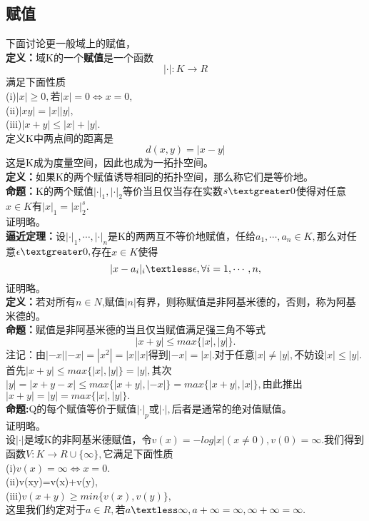 \documentclass[UTF8]{article}
\begin{document}
    \subsection{赋值}
  下面讨论更一般域上的赋值，\\
  \textbf{定义：}域K的一个\textbf{赋值}是一个函数$$
  |\cdot |:K\rightarrow R
  $$
 满足下面性质\\
 (i)$|x|\geq 0,$若$|x|=0\iff x=0,$\\
 (ii)$|xy|=|x||y|,$\\
 (iii)$|x+y|\leq |x|+|y|.$\\
     定义K中两点间的距离是$$
     d(x,y)=|x-y|
     $$
     这是K成为度量空间，因此也成为一拓扑空间。\\
     \textbf{定义：}如果K的两个赋值诱导相同的拓扑空间，那么称它们是等价地。\\
     \textbf{命题：}K的两个赋值$|\cdot|_{1},|\cdot|_{2}$等价当且仅当存在实数$s\textgreater0$使得对任意$x\in K$有$|x|_{1}=|x|_{2}^{s}.$\\
     证明略。\\
     \textbf{逼近定理：}设$|\cdot |_{1},\cdots,|\cdot|_{n}$是K的两两互不等价地赋值，任给$a_{1},\cdots,a_{n}\in K,$那么对任意$\epsilon\textgreater0,$存在$x\in K$使得$$
     |x-a_{i}|_{i}\textless\epsilon,\forall i=1,\cdots,n,
     $$
     证明略。\\
     \textbf{定义：}若对所有$n\in N$,赋值$|n|$有界，则称赋值是非阿基米德的，否则，称为阿基米德的。\\
     \textbf{命题：}赋值是非阿基米德的当且仅当赋值满足强三角不等式$$|x+y|\leq max\{|x|,|y|\}.$$
     注记：由$|-x||-x|=|x^{2}|=|x||x|$得到$|-x|=|x|.$对于任意$|x|\neq |y|,$不妨设$|x|\leq |y|$.首先$|x+y|\leq max\{|x|,|y|\}=|y|,$其次
     $|y|=|x+y-x|\leq max\{|x+y|,|-x|\}= max\{|x+y|,|x|\},$由此推出$|x+y|=|y|=max\{|x|,|y|\}.$\\
     \textbf{命题:}Q的每个赋值等价于赋值$|\cdot|_{p}$或$|\cdot|,$后者是通常的绝对值赋值。\\
     证明略。\\
     设$|\cdot|$是域K的非阿基米德赋值，令$v(x)=-log|x|(x\neq 0),v(0)=\infty.$我们得到函数$V:K\rightarrow R\cup \{\infty\},$它满足下面性质\\
     (i)$v(x)=\infty\iff x=0.$\\
     (ii)v(xy)=v(x)+v(y),\\
     (iii)$v(x+y)\geq min\{v(x),v(y)\},$\\
     这里我们约定对于$a\in R,$若$a\textless\infty ,a+\infty =\infty ,\infty +\infty =\infty .$\\
\end{document}
